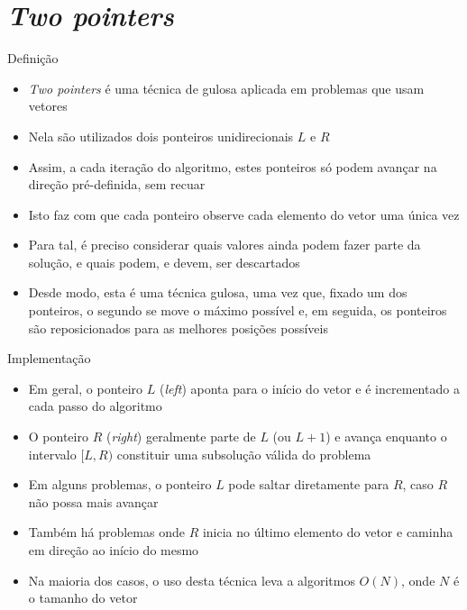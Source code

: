 \section{\it Two pointers}

\begin{frame}[fragile]{Definição}

    \begin{itemize}
        \item \textit{Two pointers} é uma técnica de gulosa aplicada em problemas que usam
            vetores

        \item Nela são utilizados dois ponteiros unidirecionais $L$ e $R$

        \item Assim, a cada iteração do algoritmo, estes ponteiros só podem avançar na direção
            pré-definida, sem recuar

        \item Isto faz com que cada ponteiro observe cada elemento do vetor uma única vez

        \item Para tal, é preciso considerar quais valores ainda podem fazer parte da solução,
            e quais podem, e devem, ser descartados

        \item Desde modo, esta é uma técnica gulosa, uma vez que, fixado um dos ponteiros, o
            segundo se move o máximo possível e, em seguida, os ponteiros são reposicionados para
            as melhores posições possíveis

    \end{itemize}

\end{frame}

\begin{frame}[fragile]{Implementação}

    \begin{itemize}
        \item Em geral, o ponteiro $L$ (\textit{left}) aponta para o início do vetor e é
            incrementado a cada passo do algoritmo

        \item O ponteiro $R$ (\textit{right}) geralmente parte de $L$ (ou $L + 1$) e avança
            enquanto o intervalo $[L, R)$ constituir uma subsolução válida do problema

        \item Em alguns problemas, o ponteiro $L$ pode saltar diretamente para $R$, caso $R$ não
            possa mais avançar

        \item Também há problemas onde $R$ inicia no último elemento do vetor e caminha em direção
            ao início do mesmo

        \item Na maioria dos casos, o uso desta técnica leva a algoritmos $O(N)$, onde $N$ é o tamanho
            do vetor
    \end{itemize}

\end{frame}
